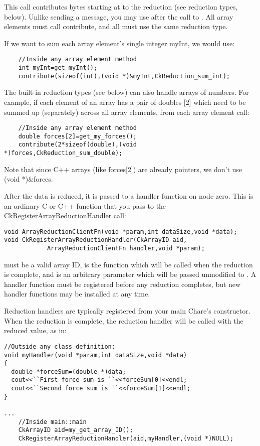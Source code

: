This call contributes  bytes starting at  to the reduction  (see reduction types, below).  Unlike sending a message, you may use  after the call to .  All array elements must call contribute, and all must use the same reduction type.

If we want to sum each array element's single integer myInt, we would use:
\begin{verbatim}
    //Inside any array element method
    int myInt=get_myInt();
    contribute(sizeof(int),(void *)&myInt,CkReduction_sum_int);
\end{verbatim}

The built-in reduction types (see below) can also handle arrays of numbers.  For example, if each element of an array has a pair of doubles [2] which need to be summed up (separately) across all array elements, from each array element call:
\begin{verbatim}
    //Inside any array element method
    double forces[2]=get_my_forces();
    contribute(2*sizeof(double),(void *)forces,CkReduction_sum_double);
\end{verbatim}
Note that since C++ arrays (like forces[2]) are already pointers, we don't use (void *)\&forces.


After the data is reduced, it is passed to a handler function on node zero.  This is an ordinary C or C++ function that you pass to the CkRegisterArrayReductionHandler call:
\begin{verbatim}
void ArrayReductionClientFn(void *param,int dataSize,void *data);
void CkRegisterArrayReductionHandler(CkArrayID aid,
            ArrayReductionClientFn handler,void *param);
\end{verbatim}

 must be a valid array ID,  is the function which will be called when the reduction is complete, and  is an arbitrary parameter which will be passed unmodified to .  A handler function must be registered before any reduction completes, but new handler functions may be installed at any time.

Reduction handlers are typically registered from your main Chare's constructor.  When the reduction is complete, the reduction handler will be called with the reduced value, as in:
\begin{verbatim}
//Outside any class definition:
void myHandler(void *param,int dataSize,void *data)
{
  double *forceSum=(double *)data;
  cout<<``First force sum is ``<<forceSum[0]<<endl;
  cout<<``Second force sum is ``<<forceSum[1]<<endl;
}

...
    //Inside main::main
    CkArrayID aid=my_get_array_ID();
    CkRegisterArrayReductionHandler(aid,myHandler,(void *)NULL);
\end{verbatim}


